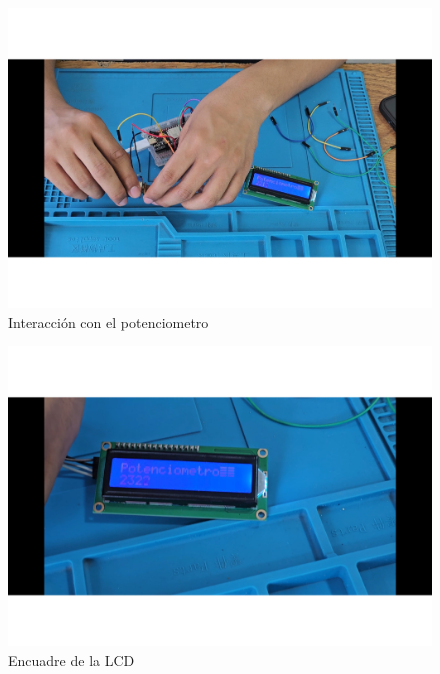    
    \begin{figure}[H]
        \centering
        \includegraphics[trim = {7mm 1mm 1mm 1mm},clip,scale=0.25]{22/Img/e15.pdf}
        \caption{Interacción con el potenciometro}
        \label{fig:evi6}
    \end{figure}
    
    
    \begin{figure}[H]
        \centering
        \includegraphics[trim = {7mm 1mm 1mm 1mm},clip,scale=0.25]{22/Img/e17.pdf}
        \caption{Encuadre de la LCD}
        \label{fig:evi7}
    \end{figure}
    
